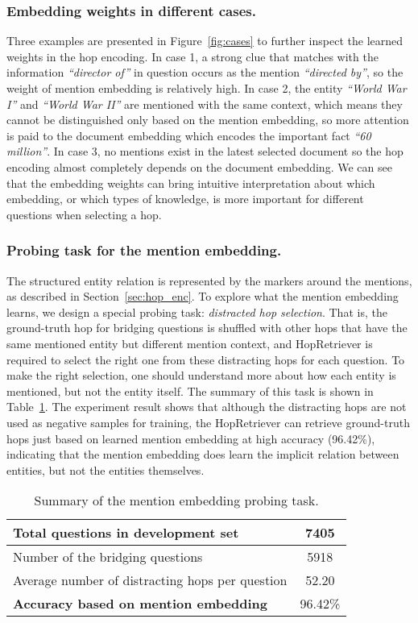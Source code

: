 \documentclass[letterpaper]{article} \usepackage{aaai21}  \usepackage{times}  \usepackage{helvet} \usepackage{courier}  \usepackage[hyphens]{url}  \usepackage{graphicx} \urlstyle{rm} \def\UrlFont{\rm}  \usepackage{graphicx}  \usepackage{natbib}  \usepackage{caption} \frenchspacing  \setlength{\pdfpagewidth}{8.5in}  \setlength{\pdfpageheight}{11in}
\begin{document}
\subsubsection{Embedding weights in different cases.}
Three examples are presented in Figure~\ref{fig:cases} to further inspect the learned weights in the hop encoding. In case 1, a strong clue that matches with the information \textit{``director of''} in question occurs as the mention \textit{``directed by''}, so the weight of mention embedding is relatively high. In case 2, the entity \textit{``World War I''} and \textit{``World War II''} are mentioned with the same context, which means they cannot be distinguished only based on the mention embedding, so more attention is paid to the document embedding which encodes the important fact \textit{``60 million''}. In case 3, no mentions exist in the latest selected document so the hop encoding almost completely depends on the document embedding. We can see that the embedding weights can bring intuitive interpretation about which embedding, or which types of knowledge, is more important for different questions when selecting a hop. 


\subsubsection{Probing task for the mention embedding.}
The structured entity relation is represented by the markers around the mentions, as described in Section~\ref{sec:hop_enc}. To explore what the mention embedding learns, we design a special probing task: \textit{distracted hop selection}. That is, the ground-truth hop for bridging questions is shuffled with other hops that have the same mentioned entity but different mention context, and HopRetriever is required to select the right one from these distracting hops for each question. To make the right selection, one should understand more about how each entity is mentioned, but not the entity itself. The summary of this task is shown in Table~\ref{tab:mention}. The experiment result shows that although the distracting hops are not used as negative samples for training, the HopRetriever can retrieve ground-truth hops just based on learned mention embedding at high accuracy (96.42\%), indicating that the mention embedding does learn the implicit relation between entities, but not the entities themselves.

\begin{table}[h]
    \centering
    \footnotesize
    \begin{tabular}{l|c}
        \hline
        Total questions in development set              & 7405    \\ \hline
        Number of the bridging questions                & 5918    \\ \hline
        Average number of distracting hops per question & 52.20   \\ \hline
        \textbf{Accuracy based on mention embedding}    & 96.42\% \\
        \hline
    \end{tabular}
    \caption{Summary of the mention embedding probing task.}
    \label{tab:mention}
\end{table}
\end{document}
